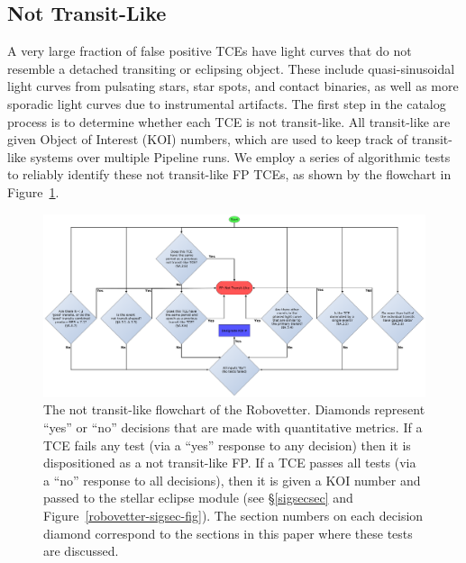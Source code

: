 \subsection{Not Transit-Like}
\label{nottransitlikesec}

A very large fraction of false positive TCEs have light curves that do not resemble a detached transiting or eclipsing object. These include quasi-sinusoidal light curves from pulsating stars, star spots, and contact binaries, as well as more sporadic light curves due to instrumental artifacts. The first step in the catalog process is to determine whether each TCE is not transit-like. All transit-like  are given \kepler{} Object of Interest (KOI) numbers, which are used to keep track of transit-like systems over multiple \kepler{} Pipeline runs. We employ a series of algorithmic tests to reliably identify these not transit-like FP TCEs, as shown by the flowchart in Figure~\ref{robovetter-transitlike-fig}.


\begin{figure}[ht]
\centering
\includegraphics[width=\linewidth]{RoboVetter-Diagram-V4-TransitLike.pdf}
\caption{The not transit-like flowchart of the Robovetter. Diamonds represent ``yes'' or ``no'' decisions that are made with quantitative metrics. If a TCE fails any test (via a ``yes'' response to any decision) then it is dispositioned as a not transit-like FP. If a TCE passes all tests (via a ``no'' response to all decisions), then it is given a KOI number and passed to the stellar eclipse module (see \S\ref{sigsecsec} and Figure~\ref{robovetter-sigsec-fig}). The section numbers on each decision diamond correspond to the sections in this paper where these tests are discussed.}
\label{robovetter-transitlike-fig}
\end{figure}



